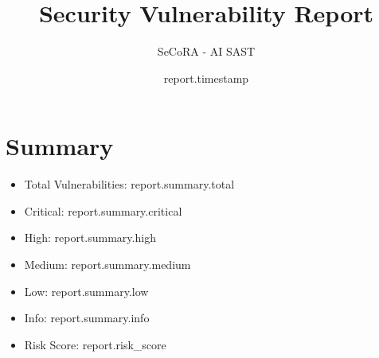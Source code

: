 \documentclass{article}
\title{Security Vulnerability Report}
\author{SeCoRA - AI SAST}
\date{{ report.timestamp }}
\begin{document}
\maketitle

\section{Summary}
\begin{itemize}
    \item Total Vulnerabilities: {{ report.summary.total }}
    \item Critical: {{ report.summary.critical }}
    \item High: {{ report.summary.high }}
    \item Medium: {{ report.summary.medium }}
    \item Low: {{ report.summary.low }}
    \item Info: {{ report.summary.info }}
    \item Risk Score: {{ report.risk_score }}
\end{itemize}
\end{document}
